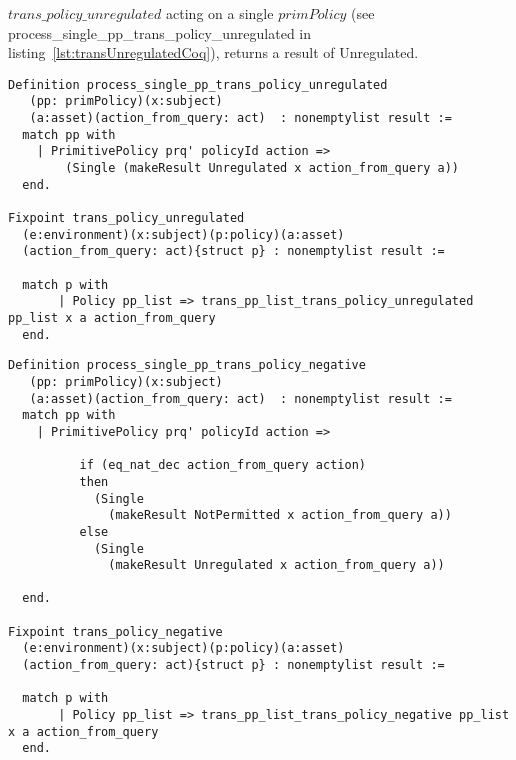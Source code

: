 $trans\_policy\_unregulated$ acting on a single $primPolicy$ (see process_single_pp_trans_policy_unregulated in listing~\ref{lst:transUnregulatedCoq}), returns a result of Unregulated.

\begin{lstlisting}
Definition process_single_pp_trans_policy_unregulated
   (pp: primPolicy)(x:subject)
   (a:asset)(action_from_query: act)  : nonemptylist result :=
  match pp with
    | PrimitivePolicy prq' policyId action =>
        (Single (makeResult Unregulated x action_from_query a))
  end.

Fixpoint trans_policy_unregulated
  (e:environment)(x:subject)(p:policy)(a:asset)
  (action_from_query: act){struct p} : nonemptylist result :=

  match p with
       | Policy pp_list => trans_pp_list_trans_policy_unregulated pp_list x a action_from_query
  end.

\end{lstlisting}

\begin{lstlisting}
Definition process_single_pp_trans_policy_negative
   (pp: primPolicy)(x:subject)
   (a:asset)(action_from_query: act)  : nonemptylist result :=
  match pp with
    | PrimitivePolicy prq' policyId action =>
 
          if (eq_nat_dec action_from_query action)
          then
            (Single 
              (makeResult NotPermitted x action_from_query a))
          else
            (Single 
              (makeResult Unregulated x action_from_query a))

  end.

Fixpoint trans_policy_negative
  (e:environment)(x:subject)(p:policy)(a:asset)
  (action_from_query: act){struct p} : nonemptylist result :=
  
  match p with  
       | Policy pp_list => trans_pp_list_trans_policy_negative pp_list x a action_from_query
  end.
\end{lstlisting}

